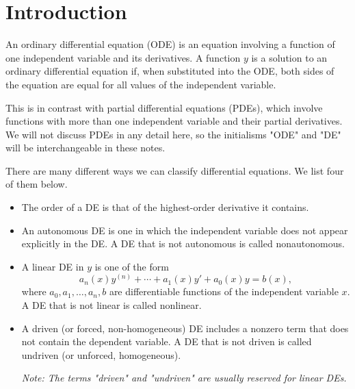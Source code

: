 \documentclass[../m082main.tex]{subfiles}
\begin{document}
\chapter{Introduction}

\begin{definition}
    An ordinary differential equation (ODE) is an equation involving a function of one independent variable and its derivatives.
    A function $y$ is a solution to an ordinary differential equation if, when substituted into the ODE, both sides of the equation are equal for all values of the independent variable.
\end{definition}

This is in contrast with partial differential equations (PDEs), which involve functions with more than one independent variable and their partial derivatives.
We will not discuss PDEs in any detail here, so the initialisms "ODE" and "DE" will be interchangeable in these notes.

There are many different ways we can classify differential equations.
We list four of them below.

\begin{definition}
    \begin{itemize}
        \item The order of a DE is that of the highest-order derivative it contains.

        \item An autonomous DE is one in which the independent variable does not appear explicitly in the DE.
        A DE that is not autonomous is called nonautonomous.

        \item A linear DE in $y$ is one of the form
        \[ a_n(x)y^{(n)} + \cdots + a_1(x)y' + a_0(x)y = b(x), \]
        where $a_0, a_1, \ldots, a_n, b$ are differentiable functions of the independent variable $x$.
        A DE that is not linear is called nonlinear.

        \item A driven (or forced, non-homogeneous) DE includes a nonzero term that does not contain the dependent variable.
        A DE that is not driven is called undriven (or unforced, homogeneous).
    
        \medskip
        \textit{Note: The terms "driven" and "undriven" are usually reserved for linear DEs.}
    \end{itemize}
\end{definition}
\end{document}
